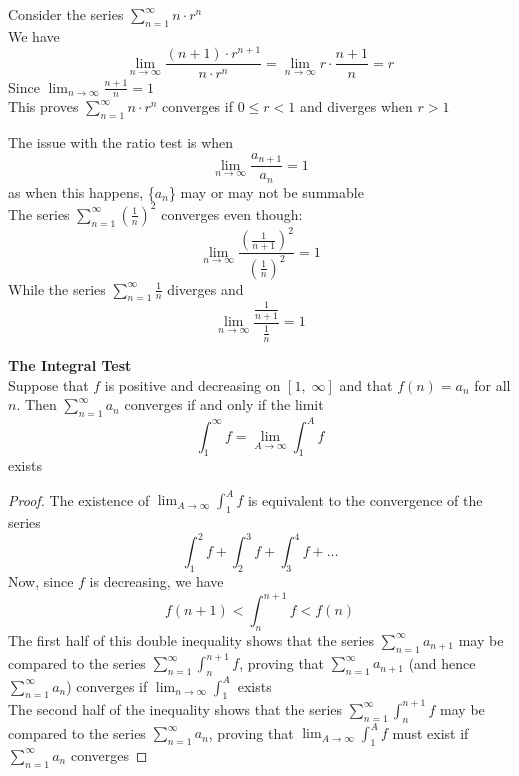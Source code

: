 \begin{eg}
    Consider the series $\sum_{n=1}^\infty n \cdot r^n$ \\
    We have 
    $$ \lim _{n\to \infty}\frac{(n+1)\cdot r^{n+1}}{n\cdot r^n} = \lim_{n\to \infty} r \cdot \frac{n+1}{n}=r$$
    Since $\lim_{n\to \infty} \frac{n+1}{n} = 1$\\
    This proves $\sum_{n=1}^\infty n \cdot r^n$ converges if $0 \leq r < 1$ and diverges when $r > 1$
\end{eg} \bigskip

\begin{remark}
    The issue with the ratio test is when
    $$\lim_{n \to \infty} \frac{a_{n+1}}{a_n}= 1$$
    as when this happens, \{$a_n$\} may or may not be summable \\
    The series $\sum_{n=1}^\infty \left( \frac{1}{n}\right)^2$ converges even though:
    $$\lim _{n\to \infty}\frac{\left(\frac{1}{n+1}\right)^2}{\left(\frac{1}{n}\right)^2}=1$$
    While the series $ \sum_{n=1}^\infty \frac{1}{n}$ diverges and 
    $$\lim_{n\to \infty} \frac{\frac{1}{n+1}}{\frac{1}{n}} = 1$$
\end{remark}
\begin{theorem}
    \textbf{The Integral Test} \\
    Suppose that $f$ is positive and decreasing on $[1,\; \infty]$ and that $f(n) = a_n$ for all $n$. Then $\sum_{n=1}^\infty a_n$ converges if and only if the limit
    $$\int _1 ^ \infty f = \lim_{A\to \infty} \int _1 ^A f$$
    exists
\end{theorem}
\begin{proof}
    The existence of $\lim_{A \to \infty} \int _1^Af$  is equivalent to the convergence of the series
    $$\int_1^2f+\int_2^3f+\int_3^4f + \dots$$
    Now, since $f$ is decreasing, we have 
    $$f(n+1) < \int _n^{n+1} f <f(n)$$
    The first half of this double inequality shows that the series $\sum_{n=1}^\infty a_{n+1}$ may be compared to the series $\sum_{n=1}^\infty \int_n^{n+1}f$, proving that $\sum_{n=1}^\infty a_{n+1}$ (and hence $\sum_{n=1}^\infty a_n$) converges if $\lim_{n\to \infty}\int_1^A$ exists\\
    The second half of the inequality shows that the series $\sum_{n=1}^\infty \int_n^{n+1} f$ may be compared to the series $\sum_{n=1}^\infty a_n$, proving that $\lim_{A\to\infty}\int_1^Af$ must exist if $\sum_{n=1}^\infty a_n$ converges
\end{proof} \bigskip

